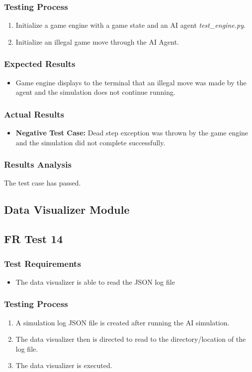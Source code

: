 \documentclass[12pt, titlepage]{article}
\begin{document}
\subsubsection{Testing Process}
\begin{enumerate}
    \item Initialize a game engine with a game state and an AI agent \textit{test\_engine.py}. 
    \item Initialize an illegal game move through the AI Agent.
\end{enumerate}
\subsubsection{Expected Results}
\begin{itemize}
    \item Game engine displays to the terminal that an illegal move was made by the agent and the simulation does not continue running.
\end{itemize}
\subsubsection{Actual Results}
\begin{itemize}
    \item \textbf{Negative Test Case:} Dead step exception was thrown by the game engine and the simulation did not complete successfully.
\end{itemize}
\subsubsection{Results Analysis}
The test case has passed.

\subsection{Data Visualizer Module}
\subsection{FR Test 14}
\subsubsection{Test Requirements}
\begin{itemize}
    \item The data visualizer is able to read the JSON log file
    
\end{itemize}
\subsubsection{Testing Process}
\begin{enumerate}
    \item A simulation log JSON file is created after running the AI simulation.
    \item The data visualizer then is directed to read to the directory/location of the log file.
    \item The data visualizer is executed.
\end{enumerate}
\end{document}

